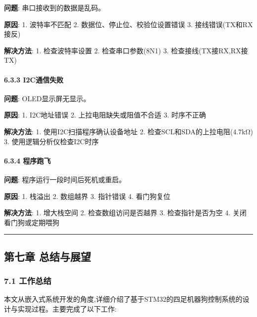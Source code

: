 \documentclass[
]{article}
\begin{document}
\textbf{问题}: 串口接收到的数据是乱码。

\textbf{原因}: 1. 波特率不匹配 2. 数据位、停止位、校验位设置错误 3.
接线错误(TX和RX接反)

\textbf{解决方法}: 1. 检查波特率设置 2. 检查串口参数(8N1) 3.
检查接线(TX接RX,RX接TX)

\hypertarget{i2cux901aux4fe1ux5931ux8d25}{%
\paragraph{6.3.3 I2C通信失败}\label{i2cux901aux4fe1ux5931ux8d25}}

\textbf{问题}: OLED显示屏无显示。

\textbf{原因}: 1. I2C地址错误 2. 上拉电阻缺失或阻值不合适 3. 时序不正确

\textbf{解决方法}: 1. 使用I2C扫描程序确认设备地址 2.
检查SCL和SDA的上拉电阻(4.7kΩ) 3. 使用逻辑分析仪检查I2C时序

\hypertarget{ux7a0bux5e8fux8dd1ux98de}{%
\paragraph{6.3.4 程序跑飞}\label{ux7a0bux5e8fux8dd1ux98de}}

\textbf{问题}: 程序运行一段时间后死机或重启。

\textbf{原因}: 1. 栈溢出 2. 数组越界 3. 指针错误 4. 看门狗复位

\textbf{解决方法}: 1. 增大栈空间 2. 检查数组访问是否越界 3.
检查指针是否为空 4. 关闭看门狗或定期喂狗

\begin{center}\rule{0.5\linewidth}{0.5pt}\end{center}

\hypertarget{ux7b2cux4e03ux7ae0-ux603bux7ed3ux4e0eux5c55ux671b}{%
\subsection{第七章
总结与展望}\label{ux7b2cux4e03ux7ae0-ux603bux7ed3ux4e0eux5c55ux671b}}

\hypertarget{ux5de5ux4f5cux603bux7ed3}{%
\subsubsection{7.1 工作总结}\label{ux5de5ux4f5cux603bux7ed3}}

本文从嵌入式系统开发的角度,详细介绍了基于STM32的四足机器狗控制系统的设计与实现过程。主要完成了以下工作:
\end{document}
